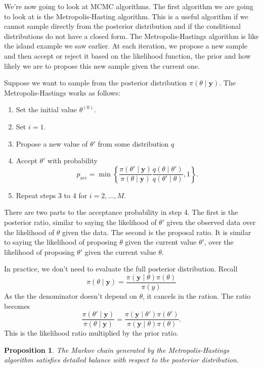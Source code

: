 \documentclass[
]{book}
\newtheorem{proposition}{Proposition}[chapter]
\theoremstyle{definition}
\theoremstyle{definition}
\theoremstyle{definition}
\theoremstyle{definition}
\theoremstyle{remark}
\begin{document}
We're now going to look at MCMC algorithms. The first algorithm we are going to look at is the Metropolis-Hasting algorithm. This is a useful algorithm if we cannot sample directly from the posterior distribution and if the conditional distributions do not have a closed form. The Metropolis-Hastings algorithm is like the island example we saw earlier. At each iteration, we propose a new sample and then accept or reject it based on the likelihood function, the prior and how likely we are to propose this new sample given the current one.

Suppose we want to sample from the posterior distribution \(\pi(\theta \mid \boldsymbol{y})\). The Metropolis-Hastings works as follows:

\begin{enumerate}
\def\labelenumi{\arabic{enumi}.}
\item
  Set the initial value \(\theta^{(0)}\).
\item
  Set \(i = 1\).
\item
  Propose a new value of \(\theta'\) from some distribution \(q\)
\item
  Accept \(\theta'\) with probability
  \[
  p_{\textrm{acc}} = \min\left\{\frac{\pi(\theta' \mid \boldsymbol{y})}{\pi(\theta \mid \boldsymbol{y})}\frac{q(\theta \mid \theta')}{q(\theta' \mid \theta)}, 1\right\}.
  \]
\item
  Repeat steps 3 to 4 for \(i = 2, \ldots, M\).
\end{enumerate}

There are two parts to the acceptance probability in step 4. The first is the posterior ratio, similar to saying the likelihood of \(\theta'\) given the observed data over the likelihood of \(\theta\) given the data. The second is the proposal ratio. It is similar to saying the likelihood of proposing \(\theta\) given the current value \(\theta'\), over the likelihood of proposing \(\theta'\) given the current value \(\theta\).

In practice, we don't need to evaluate the full posterior distribution. Recall
\[
\pi(\theta \mid \boldsymbol{y}) = \frac{\pi(\boldsymbol{y} \mid \theta) \pi(\theta)}{\pi(y)}
\]
As the the denominator doesn't depend on \(\theta\), it cancels in the ration. The ratio becomes
\[
\frac{\pi(\theta' \mid \boldsymbol{y})}{\pi(\theta \mid \boldsymbol{y})} = \frac{\pi(\boldsymbol{y} \mid \theta') \pi(\theta')}{\pi(\boldsymbol{y} \mid \theta) \pi(\theta)}.
\]
This is the likelihood ratio multiplied by the prior ratio.

\begin{proposition}
The Markov chain generated by the Metropolis-Hastings algorithm satisfies detailed balance with respect to the posterior distribution.
\end{proposition}
\end{document}

